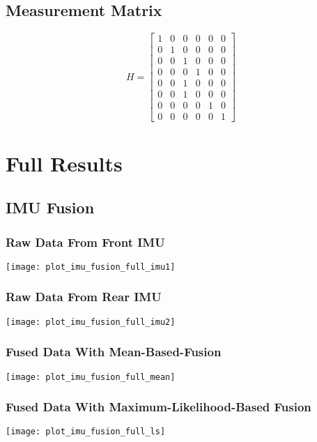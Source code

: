 \section{Measurement Matrix}\label{sec:appendix-ekf-measurement}
\begin{equation*}%
H = \begin{bmatrix}%
1 & 0 & 0 & 0 & 0 & 0 \\%
0 & 1 & 0 & 0 & 0 & 0 \\%
0 & 0 & 1 & 0 & 0 & 0 \\%
0 & 0 & 0 & 1 & 0 & 0 \\%
0 & 0 & 1 & 0 & 0 & 0 \\%
0 & 0 & 1 & 0 & 0 & 0 \\%
0 & 0 & 0 & 0 & 1 & 0 \\%
0 & 0 & 0 & 0 & 0 & 1%
\end{bmatrix}%
\end{equation*}

\chapter{Full Results}
\section{IMU Fusion}\label{sec:appendix-imufusion}
\subsection{Raw Data From Front IMU}
\texttt{[image: plot\_imu\_fusion\_full\_imu1]}
\subsection{Raw Data From Rear IMU}
\texttt{[image: plot\_imu\_fusion\_full\_imu2]}
\subsection{Fused Data With Mean-Based-Fusion}
\texttt{[image: plot\_imu\_fusion\_full\_mean]}
\subsection{Fused Data With Maximum-Likelihood-Based Fusion}
\texttt{[image: plot\_imu\_fusion\_full\_ls]}
